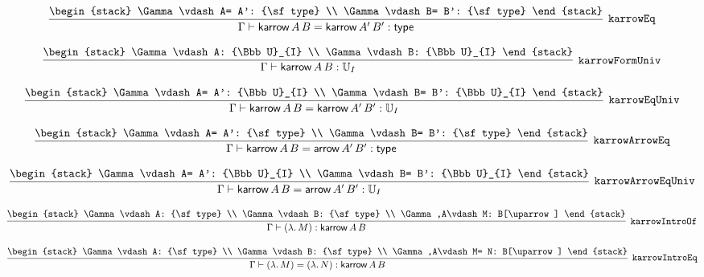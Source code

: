 \[
\infer[{\tt karrowEq}]{\Gamma \vdash {\sf karrow}\,A\,B= {\sf karrow}\,A'\,B': {\sf type}}{
\begin{stack}
\Gamma \vdash A= A': {\sf type}
\\
\Gamma \vdash B= B': {\sf type}
\end{stack}}
\]

\[
\infer[{\tt karrowFormUniv}]{\Gamma \vdash {\sf karrow}\,A\,B: {\Bbb U}_{I}}{
\begin{stack}
\Gamma \vdash A: {\Bbb U}_{I}
\\
\Gamma \vdash B: {\Bbb U}_{I}
\end{stack}}
\]

\[
\infer[{\tt karrowEqUniv}]{\Gamma \vdash {\sf karrow}\,A\,B= {\sf karrow}\,A'\,B': {\Bbb U}_{I}}{
\begin{stack}
\Gamma \vdash A= A': {\Bbb U}_{I}
\\
\Gamma \vdash B= B': {\Bbb U}_{I}
\end{stack}}
\]

\[
\infer[{\tt karrowArrowEq}]{\Gamma \vdash {\sf karrow}\,A\,B= {\sf arrow}\,A'\,B': {\sf type}}{
\begin{stack}
\Gamma \vdash A= A': {\sf type}
\\
\Gamma \vdash B= B': {\sf type}
\end{stack}}
\]

\[
\infer[{\tt karrowArrowEqUniv}]{\Gamma \vdash {\sf karrow}\,A\,B= {\sf arrow}\,A'\,B': {\Bbb U}_{I}}{
\begin{stack}
\Gamma \vdash A= A': {\Bbb U}_{I}
\\
\Gamma \vdash B= B': {\Bbb U}_{I}
\end{stack}}
\]

\[
\infer[{\tt karrowIntroOf}]{\Gamma \vdash (\lambda .\,M): {\sf karrow}\,A\,B}{
\begin{stack}
\Gamma \vdash A: {\sf type}
\\
\Gamma \vdash B: {\sf type}
\\
\Gamma ,A\vdash M: B[\uparrow ]
\end{stack}}
\]

\[
\infer[{\tt karrowIntroEq}]{\Gamma \vdash (\lambda .\,M)= (\lambda .\,N): {\sf karrow}\,A\,B}{
\begin{stack}
\Gamma \vdash A: {\sf type}
\\
\Gamma \vdash B: {\sf type}
\\
\Gamma ,A\vdash M= N: B[\uparrow ]
\end{stack}}
\]

